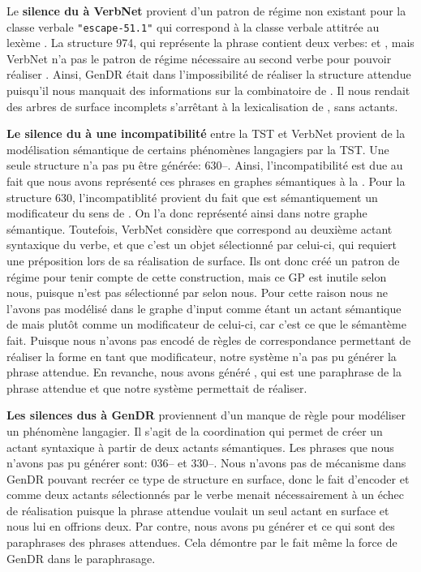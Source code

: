 Le \textbf{silence du à VerbNet} provient d'un patron de régime non existant pour la classe verbale \texttt{"escape-51.1"} qui correspond à la classe verbale attitrée au lexème . La structure 974, qui représente la phrase  contient deux verbes:  et , mais VerbNet n'a pas le patron de régime nécessaire au second verbe pour pouvoir réaliser . Ainsi, GenDR était dans l'impossibilité de réaliser la structure attendue puisqu'il nous manquait des informations sur la combinatoire de . Il nous rendait des arbres de surface incomplets s'arrêtant à la lexicalisation de , sans actants.

\textbf{Le silence du à une incompatibilité} entre la \ac{TST} et VerbNet provient de la modélisation sémantique de certains phénomènes langagiers par la \ac{TST}. Une seule structure n'a pas pu être générée: 630--. Ainsi, l'incompatibilité est due au fait que nous avons représenté ces phrases en graphes sémantiques à la \cite{mel2012semantics}. 
Pour la structure 630, l'incompatiblité provient du fait que  est sémantiquement un modificateur du sens de . On l'a donc représenté ainsi dans notre graphe sémantique. Toutefois, VerbNet considère que  correspond au deuxième actant syntaxique du verbe, et que c'est un objet sélectionné par celui-ci, qui requiert une préposition lors de sa réalisation de surface. Ils ont donc créé un patron de régime pour tenir compte de cette construction, mais ce \ac{GP} est inutile selon nous, puisque  n'est pas sélectionné par  selon nous. Pour cette raison nous ne l'avons pas modélisé dans le graphe d'input comme étant un actant sémantique de  mais plutôt comme un modificateur de celui-ci, car c'est ce que le sémantème  fait. Puisque nous n'avons pas encodé de règles de correspondance permettant de réaliser la forme  en tant que modificateur, notre système n'a pas pu générer la phrase attendue. En revanche, nous avons généré , qui est une paraphrase de la phrase attendue et que notre système permettait de réaliser. 

\textbf{Les silences dus à GenDR} proviennent d'un manque de règle pour modéliser un phénomène langagier. Il s'agit de la coordination qui permet de créer un actant syntaxique à partir de deux actants sémantiques. Les phrases que nous n'avons pas pu générer sont: 036-- et 330--. Nous n'avons pas de mécanisme dans GenDR pouvant recréer ce type de structure en surface, donc le fait d'encoder  et  comme deux actants sélectionnés par le verbe menait nécessairement à un échec de réalisation puisque la phrase attendue voulait un seul actant en surface et nous lui en offrions deux. Par contre, nous avons pu générer  et  ce qui sont des paraphrases des phrases attendues. Cela démontre par le fait même la force de GenDR dans le paraphrasage.

